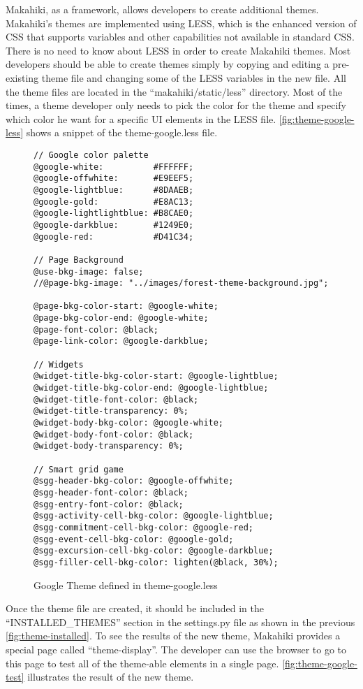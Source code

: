 Makahiki, as a framework, allows developers to create additional themes. Makahiki's themes are implemented using LESS, which is the  enhanced version of CSS that supports variables and other capabilities not available in standard CSS. There is no need to know about LESS in order to create Makahiki themes. Most developers should be able to create themes simply by copying and editing a pre-existing theme file and changing some of the LESS variables in the new file. All the theme files are located in the ``makahiki/static/less'' directory.  Most of the times, a theme developer only needs to pick the color for the theme and specify which color he want for a specific UI elements in the LESS file. \autoref{fig:theme-google-less} shows a snippet of the theme-google.less file.

\begin{figure}[!ht]
\begin{lstlisting}
// Google color palette
@google-white:          #FFFFFF;
@google-offwhite:       #E9EEF5;
@google-lightblue:      #8DAAEB;
@google-gold:           #E8AC13;
@google-lightlightblue: #B8CAE0;
@google-darkblue:       #1249E0;
@google-red:            #D41C34;

// Page Background
@use-bkg-image: false;
//@page-bkg-image: "../images/forest-theme-background.jpg";

@page-bkg-color-start: @google-white;
@page-bkg-color-end: @google-white;
@page-font-color: @black;
@page-link-color: @google-darkblue;

// Widgets
@widget-title-bkg-color-start: @google-lightblue;
@widget-title-bkg-color-end: @google-lightblue;
@widget-title-font-color: @black;
@widget-title-transparency: 0%;
@widget-body-bkg-color: @google-white;
@widget-body-font-color: @black;
@widget-body-transparency: 0%;

// Smart grid game
@sgg-header-bkg-color: @google-offwhite;
@sgg-header-font-color: @black;
@sgg-entry-font-color: @black;
@sgg-activity-cell-bkg-color: @google-lightblue;
@sgg-commitment-cell-bkg-color: @google-red;
@sgg-event-cell-bkg-color: @google-gold;
@sgg-excursion-cell-bkg-color: @google-darkblue;
@sgg-filler-cell-bkg-color: lighten(@black, 30%);

\end{lstlisting}
\caption{Google Theme defined in theme-google.less}
\label{fig:theme-google-less}
\end{figure}

Once the theme file are created, it should be included in the ``INSTALLED\_THEMES'' section in the settings.py file as shown in the previous \autoref{fig:theme-installed}. To see the results of the new theme, Makahiki provides a special page called ``theme-display''. The developer can use the browser to go to this page to test all of the theme-able elements in a single page. \autoref{fig:theme-google-test} illustrates the result of the new theme.

